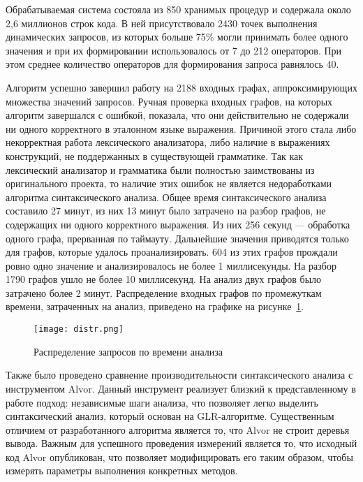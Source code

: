 Обрабатываемая система состояла из 850 хранимых процедур и содержала около 2,6 миллионов строк кода. В ней присутствовало 2430 точек выполнения динамических запросов, из которых больше 75\% могли принимать 
более одного значения и при их формировании использовалось от 7 до 212 операторов. При этом среднее количество операторов для формирования запроса равнялось 40.


Алгоритм успешно завершил работу на 2188 входных графах, аппроксимирующих множества значений запросов. Ручная проверка входных графов, на которых алгоритм завершался с ошибкой, показала, что они 
действительно не содержали ни одного корректного в эталонном языке выражения. Причиной этого стала либо некорректная работа лексического анализатора, либо наличие в выражениях конструкций, 
не поддержанных в существующей грамматике. Так как лексический анализатор и грамматика были полностью заимствованы из оригинального проекта, то наличие этих ошибок не является недоработками алгоритма 
синтаксического анализа. Общее время синтаксического анализа составило 27 минут, из них 13 минут было затрачено на разбор графов, не содержащих ни одного корректного выражения. Из них 256 секунд --- обработка 
одного графа, прерванная по таймауту. Дальнейшие значения приводятся только для графов, которые удалось проанализировать. 604 из этих графов прождали ровно одно значение и анализировалось не более 1 
миллисекунды. На разбор 1790 графов ушло не более 10 миллисекунд. На анализ двух графов было затрачено более 2 минут. Распределение входных графов по промежуткам времени, затраченных на анализ, приведено на графике на рисунке~\ref{distr}.

\begin{figure}[H]
  \centering
 \texttt{[image: distr.png]}
 \caption{Распределение запросов по времени анализа}
 \label{distr}
\end{figure}


Также было проведено сравнение производительности синтаксического анализа с инструментом Alvor. Данный инструмент реализует  близкий к представленному в работе подход: независимые 
шаги анализа, что позволяет легко выделить синтаксический анализ, который основан на GLR-алгоритме. Существенным отличием от разработанного алгоритма является то, что Alvor не строит деревья вывода. Важным 
для успешного проведения измерений является то, что исходный код Alvor опубликован, что позволяет модифицировать его таким образом, чтобы измерять параметры выполнения конкретных методов. 

